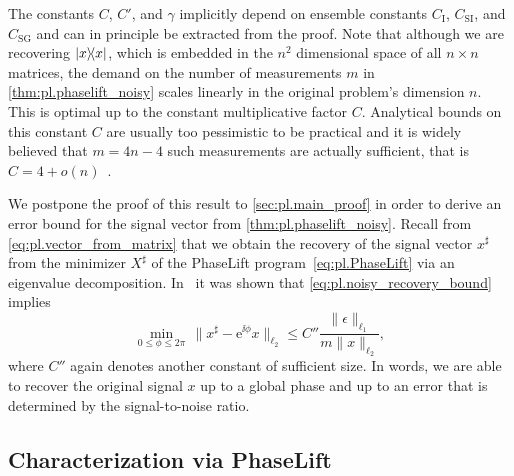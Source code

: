 The constants $C$, $C'$, and $\gamma$ implicitly depend on ensemble constants $C_\mathrm{I}$, $C_\mathrm{SI}$, and $C_\mathrm{SG}$ and can in principle be extracted from the proof.
Note that although we are recovering $\ketbra{x}$, which is embedded in the $n^2$ dimensional space of all $n \times n$ matrices, the demand on the number of measurements $m$ in \cref{thm:pl.phaselift_noisy} scales linearly in the original problem's dimension $n$.
This is optimal up to the constant multiplicative factor $C$.
Analytical bounds on this constant $C$ are usually too pessimistic to be practical and it is widely believed that
\(
  m = 4n - 4
\)
such measurements are actually sufficient, that is $C = 4 + o(n)$~\cite{Heinosaari_2013_Quantum}.

We postpone the proof of this result to \cref{sec:pl.main_proof} in order to derive an error bound for the signal vector from \cref{thm:pl.phaselift_noisy}.
Recall from \cref{eq:pl.vector_from_matrix} that we obtain the recovery of the signal vector ${x}^\sharp$ from the minimizer ${X}^\sharp$ of the PhaseLift program~\cref{eq:pl.PhaseLift} via an eigenvalue decomposition.
In~\cite{Candes_2012_Solving} it was shown that \cref{eq:pl.noisy_recovery_bound} implies
\[
  \min_{0 \leq \phi \leq 2 \pi} \, \| {x}^\sharp - \mathrm{e}^{\ii \phi} {x} \|_{\ell_2}
  \leq C'' \frac{\| \epsilon \|_{\ell_1} }{m \| {x} \|_{\ell_2}}
, \label{eq:vectorial_noisy_bound}
\]
where $C''$ again denotes another constant of sufficient size.
In words, we are able to recover the original signal $x$ up to a global phase and up to an error that is determined by the signal-to-noise ratio.


\subsection{Characterization via PhaseLift}
\label{sub:pl.characterization}

